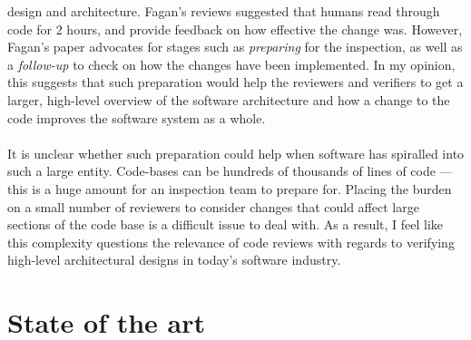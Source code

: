 design and architecture.
Fagan's reviews suggested that humans read through code for 2 hours, and provide feedback on how
effective the change was.
However, Fagan's paper advocates for stages such as {\em preparing} for the inspection, as well as
a {\em follow-up} to check on how the changes have been implemented.
In my opinion, this suggests that such preparation would help the reviewers and verifiers to get a
larger, high-level overview of the software architecture and how a change to the code improves the
software system as a whole.\\
\\
It is unclear whether such preparation could help when software has spiralled into such a large
entity.
Code-bases can be hundreds of thousands of lines of code --- this is a huge amount for an inspection
team to prepare for.
Placing the burden on a small number of reviewers to consider changes that could affect large sections
of the code base is a difficult issue to deal with.
As a result, I feel like this complexity questions the relevance of code reviews with regards to verifying
high-level architectural designs in today's software industry.

\section{State of the art} \label{sec:litsurvey:current}

